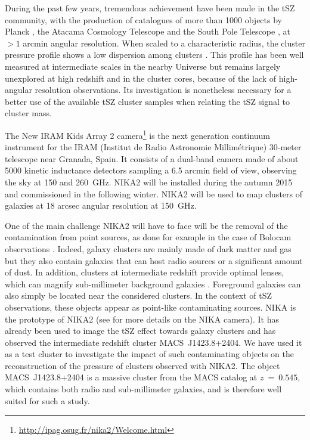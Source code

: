 \documentclass[twocolumn,traditabstract]{aa}
\begin{document}
During the past few years, tremendous achievement have been made in the tSZ community, with the production of catalogues of more than 1000 objects by Planck \citep{planck2013catalogue}, the Atacama Cosmology Telescope \citep[ACT,][]{hasselfield2013} and the South Pole Telescope \citep[SPT,][]{reichardt2013,bleem2014}, at $>1$ arcmin angular resolution. When scaled to a characteristic radius, the cluster pressure profile shows a low dispersion among clusters \citep{arnaud2010}. This profile has been well measured at intermediate scales in the nearby Universe \citep{planck2013pressure_profile,sayers2013b} but remains largely unexplored at high redshift and in the cluster cores, because of the lack of high-angular resolution observations. Its investigation is nonetheless necessary for a better use of the available tSZ cluster samples when relating the tSZ signal to cluster mass.

The New IRAM Kids Array 2 \citep[NIKA2,][]{monfardini2014} camera\footnote{\url{http://ipag.osug.fr/nika2/Welcome.html}} is the next generation continuum instrument for the IRAM (Institut de Radio Astronomie Millim\'etrique) 30-meter telescope near Granada, Spain. It consists of a dual-band camera made of about 5000 kinetic inductance detectors sampling a 6.5 arcmin field of view, observing the sky at 150 and 260~GHz. NIKA2 will be installed during the autumn 2015 and commissioned in the following winter. NIKA2 will be used to map clusters of galaxies at 18 arcsec angular resolution at 150~GHz. 

One of the main challenge NIKA2 will have to face will be the removal of the contamination from point sources, as done for example in the case of Bolocam observations \citep{sayers2013a}. Indeed, galaxy clusters are mainly made of dark matter and gas but they also contain galaxies that can host radio sources or a significant amount of dust. In addition, clusters at intermediate redshift provide optimal lenses, which can magnify sub-millimeter background galaxies \citep[see e.g.][]{adam2014}. Foreground galaxies can also simply be located near the considered clusters. In the context of tSZ observations, these objects appear as point-like contaminating sources. NIKA is the prototype of NIKA2 (see \cite{monfardini2010,bourion2011,bourrion2012,monfardini2011,calvo2012,catalano2014} for more details on the NIKA camera). It has already been used to image the tSZ effect towards galaxy clusters \citep[\mbox{RX~J1347.5-1145} and \mbox{CL~J1226.9+3332}, see][]{adam2013,adam2014} and has observed the intermediate redshift cluster \mbox{MACS~J1423.8+2404}. We have used it as a test cluster to investigate the impact of such contaminating objects on the reconstruction of the pressure of clusters observed with NIKA2. The object \mbox{MACS~J1423.8+2404} is a massive cluster from the MACS catalog \citep[Massive Cluster Survey,][]{ebeling2001} at $z~=~0.545$, which contains both radio and sub-millimeter galaxies, and is therefore well suited for such a study. 
\end{document}
